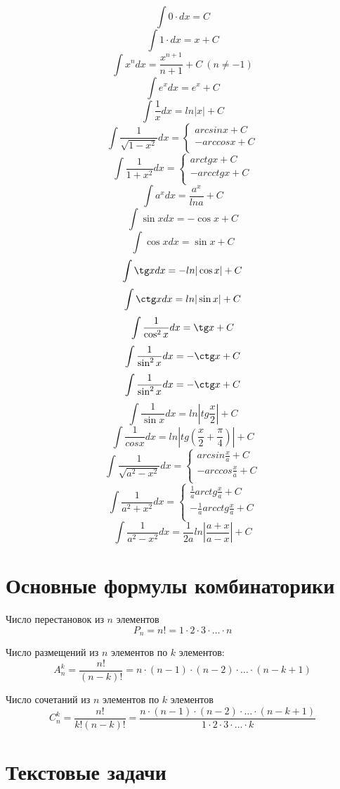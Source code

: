 \documentclass[a5paper, 8pt]{extarticle}
\begin{document}
$$\int 0\cdot dx=C$$
$$\int 1\cdot dx=x+C$$
$$\int x^n dx=\frac{x^{n+1}}{n+1}+C \ (n\not= -1)$$
$$\int e^x dx=e^x+C$$
$$\int \frac{1}{x}dx=ln|x|+C$$
$$
\int\frac{1}{\sqrt{1-x^2}}dx=
\left\{
\begin{array}{l}
arcsin x+C\\
-arccos x+C\\
\end{array}
\right.
$$
$$
\int\frac{1}{1+x^2}dx=
\left\{
\begin{array}{l}
arctg x+C\\
-arcctg x+C\\
\end{array}
\right.
$$
$$\int a^xdx=\frac{a^x}{lna}+C$$
$$\int \sin x dx=-\cos x+C$$
$$\int \cos x dx=\sin x+C$$
$$\int \tg x dx=-ln|\cos x|+C$$
$$\int \ctg x dx=ln|\sin x| +C$$
$$\int\frac{1}{\cos^2x}dx=\tg x +C$$
$$\int\frac{1}{\sin^2 x}dx=-\ctg x +C$$
$$\int\frac{1}{\sin^2x}dx=-\ctg x +C$$
$$\int \frac{1}{\sin x}dx=ln\left|tg\frac{x}{2}\right|+C$$
$$\int\frac{1}{cos x}dx=ln\left|tg(\frac{x}{2}+\frac{\pi}{4})\right|+C$$
$$
\int\frac{1}{\sqrt{a^2-x^2}}dx=
\left\{
\begin{array}{l}
arcsin\frac{x}{a}+C\\
-arccos\frac{x}{a}+C\\
\end{array}
\right.
$$
$$
\int\frac{1}{a^2+x^2}dx=
\left\{
\begin{array}{l}
\frac{1}{a}arctg\frac{x}{a}+C\\
-\frac{1}{a}arcctg\frac{x}{a}+C\\
\end{array}
\right.
$$
$$
\int\frac{1}{a^2-x^2}dx=
\frac{1}{2a}ln|\frac{a+x}{a-x}|+C
$$



\section{Основные формулы комбинаторики}

Число перестановок из $n$ элементов 
$$P_n=n!=1\cdot 2\cdot 3\cdot \dots \cdot n$$

Число размещений из $n$ элементов по $k$ элементов:
$$A_n^k=\frac{n!}{(n-k)!}=n\cdot (n-1)\cdot (n-2)\cdot \dots \cdot (n-k+1)$$

Число сочетаний из $n$ элементов по $k$ элементов
$$C_n^k=\frac{n!}{k!(n-k)!}=\frac{n\cdot (n-1)\cdot (n-2)\cdot \dots \cdot (n-k+1)}{1\cdot 2\cdot 3\cdot \dots \cdot k}$$

\section{Текстовые задачи}
\end{document}
